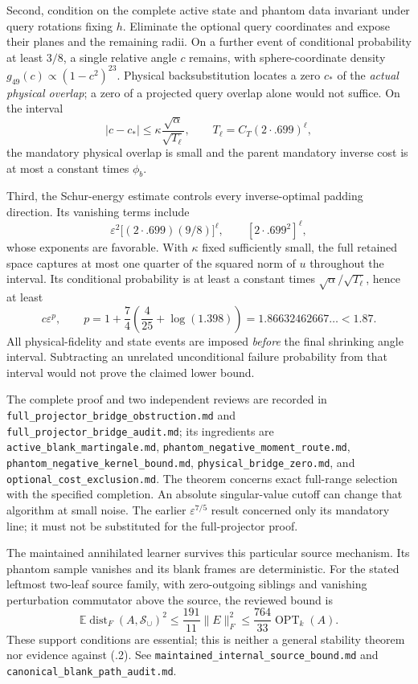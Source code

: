 \documentclass[11pt,oneside,openany,a4paper]{book}
\numberwithin{equation}{chapter}
\theoremstyle{definition}
\theoremstyle{remark}
\newcommand{\sourcefile}[1]{{\small\nolinkurl{#1}}}
\begin{document}
Second, condition on the complete active state and phantom data
invariant under query rotations fixing $h$.  Eliminate the optional
query coordinates and expose their planes and the remaining radii.
On a further event of conditional probability at least $3/8$, a single
relative angle $c$ remains, with sphere-coordinate density
$g_{49}(c)\propto(1-c^2)^{23}$.  Physical backsubstitution locates a
zero $c_*$ of the \emph{actual physical overlap}; a zero of a projected
query overlap alone would not suffice.  On the interval
\[
 |c-c_*|\le\kappa\frac{\sqrt\alpha}{\sqrt{T_\ell}},
 \qquad T_\ell=C_T(2\cdot .699)^\ell,
\]
the mandatory physical overlap is small and the parent mandatory
inverse cost is at most a constant times $\phi_b$.

Third, the Schur-energy estimate controls every inverse-optimal
padding direction.  Its vanishing terms include
\[
 \varepsilon^2\bigl[(2\cdot .699)(9/8)\bigr]^\ell,
 \qquad [2\cdot .699^2]^\ell,
\]
whose exponents are favorable.  With $\kappa$ fixed sufficiently small,
the full retained space captures at most one quarter of the squared
norm of $u$ throughout the interval.  Its conditional probability is
at least a constant times $\sqrt\alpha/\sqrt{T_\ell}$, hence at least
\[
 c\varepsilon^p,\qquad
 p=1+\frac74\left(\frac4{25}+\log(1.398)\right)
   =1.86632462667\ldots<1.87.
\]
All physical-fidelity and state events are imposed \emph{before} the
final shrinking angle interval.  Subtracting an unrelated
unconditional failure probability from that interval would not prove
the claimed lower bound.

The complete proof and two independent reviews are recorded in
\sourcefile{full_projector_bridge_obstruction.md} and
\sourcefile{full_projector_bridge_audit.md}; its ingredients are
\sourcefile{active_blank_martingale.md},
\sourcefile{phantom_negative_moment_route.md},
\sourcefile{phantom_negative_kernel_bound.md},
\sourcefile{physical_bridge_zero.md}, and
\sourcefile{optional_cost_exclusion.md}.  The theorem concerns exact
full-range selection with the specified completion.  An absolute
singular-value cutoff can change that algorithm at small noise.  The
earlier $\varepsilon^{7/5}$ result concerned only its mandatory line;
it must not be substituted for the full-projector proof.

The maintained annihilated learner survives this particular source
mechanism.  Its phantom sample vanishes and its blank frames are
deterministic.  For the stated leftmost two-leaf source family, with
zero-outgoing siblings and vanishing perturbation commutator above the
source, the reviewed bound is
\[
 \mathbb E\operatorname{dist}_F(A,\mathcal S_\cup)^2
 \le\frac{191}{11}\|E\|_F^2
 \le\frac{764}{33}\operatorname{OPT}_k(A).
\]
These support conditions are essential; this is neither a general
stability theorem nor evidence against (\thechapter.2).
See \sourcefile{maintained_internal_source_bound.md} and
\sourcefile{canonical_blank_path_audit.md}.
\end{document}
